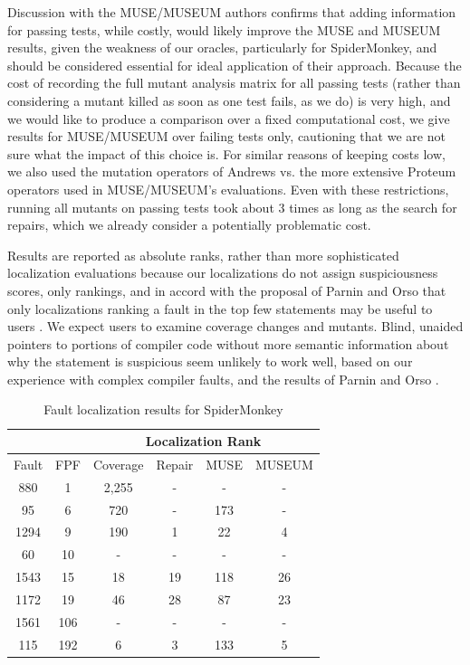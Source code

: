 Discussion with the MUSE/MUSEUM authors confirms  that adding information for passing tests, while costly, would likely improve the MUSE and MUSEUM results, given the weakness of our oracles, particularly for SpiderMonkey, and should be considered essential for ideal application of their approach.  Because the cost of recording the full mutant analysis matrix for all passing tests (rather than considering a mutant killed as soon as one test fails, as we do) is very high, and we would like to produce a comparison over a fixed computational cost, we give results for MUSE/MUSEUM over failing tests only, cautioning that we are not sure what the impact of this choice is.  For similar reasons of keeping costs low, we also used the mutation operators of Andrews vs. the more extensive Proteum \cite{Proteum} operators used in MUSE/MUSEUM's evaluations.  Even with these restrictions, running all mutants on passing tests took about 3 times as long as the search for repairs, which we already consider a potentially problematic cost.

Results are reported as absolute ranks, rather than more sophisticated \cite{MUSE} localization evaluations because our localizations do not assign suspiciousness scores, only rankings, and in accord with the proposal of Parnin and Orso that only localizations ranking a fault in the top few statements may be useful to users \cite{AutoHelp}.  We expect users to examine coverage changes and mutants.  Blind, unaided pointers to portions of compiler code without more semantic information about why the statement is suspicious seem unlikely to work well, based on our experience with complex compiler faults, and the results of Parnin and Orso \cite{AutoHelp}.

\begin{table}
\centering
{\scriptsize
\begin{tabular}{|c||c||c|c|c|c|}
\hline
& & \multicolumn{4}{|c|}{Localization Rank} \\
\hline
Fault & FPF & Coverage & Repair & MUSE & MUSEUM \\
\hline
880 & 1 & 2,255 & - & - & - \\
95 & 6 & 720 & - & 173 & -\\
1294 & 9 & 190 & 1 & 22 & 4 \\
60 & 10 & - & - & - & -\\
1543 & 15 & 18 & 19 & 118 & 26\\
1172 & 19 & 46 & 28 & 87 & 23\\
1561 & 106 & - & - & - & - \\
115 & 192 & 6 & 3 & 133 & 5 \\
\hline
\end{tabular}
}
\caption{Fault localization results for SpiderMonkey}
\label{jstable}
\end{table}


